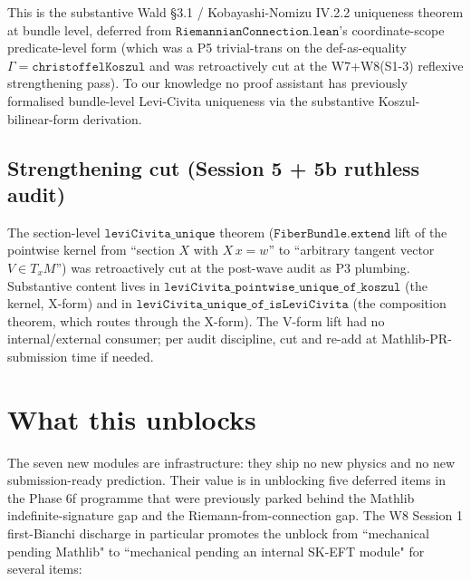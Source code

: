 \documentclass[twocolumn]{revtex4-2}
\newcommand{\Christoffel}{\Gamma}
\begin{document}
This is the substantive Wald \S 3.1 / Kobayashi-Nomizu IV.2.2
uniqueness theorem at bundle level, deferred from
$\texttt{RiemannianConnection.lean}$'s coordinate-scope predicate-level
form (which was a P5 trivial-trans on the def-as-equality
$\Christoffel = \texttt{christoffelKoszul}$ and was retroactively cut
at the W7+W8(S1-3) reflexive strengthening pass). To our knowledge no
proof assistant has previously formalised bundle-level Levi-Civita
uniqueness via the substantive Koszul-bilinear-form derivation.

\subsection{Strengthening cut (Session 5 + 5b ruthless audit)}

The section-level $\texttt{leviCivita\_unique}$ theorem
($\texttt{FiberBundle.extend}$ lift of the pointwise kernel from
``section $X$ with $X\,x = w$'' to ``arbitrary tangent vector $V \in
T_xM$'') was retroactively cut at the post-wave audit as P3 plumbing.
Substantive content lives in
$\texttt{leviCivita\_pointwise\_unique\_of\_koszul}$ (the kernel,
X-form) and in $\texttt{leviCivita\_unique\_of\_isLeviCivita}$ (the
composition theorem, which routes through the X-form). The V-form
lift had no internal/external consumer; per audit discipline, cut and
re-add at Mathlib-PR-submission time if needed.

\section{What this unblocks}\label{sec:unblocks}

The seven new modules are infrastructure: they ship no new physics and
no new submission-ready prediction. Their value is in unblocking five
deferred items in the Phase 6f programme that were previously parked
behind the Mathlib indefinite-signature gap and the
Riemann-from-connection gap. The W8 Session 1 first-Bianchi discharge
in particular promotes the unblock from ``mechanical pending Mathlib"
to ``mechanical pending an internal SK-EFT module" for several items:
\end{document}
